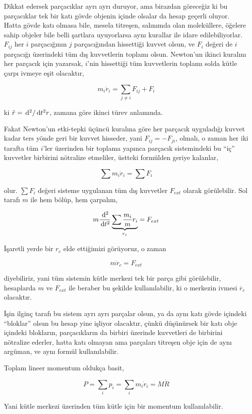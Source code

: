 \documentclass[12pt,fleqn]{article}\usepackage{../../common}
\begin{document}
Dikkat edersek parçacıklar ayrı ayrı duruyor, ama birazdan göreceğiz ki bu
parçacıklar tek bir katı gövde objenin içinde olsalar da hesap geçerli
oluyor. Hatta gövde katı olmasa bile, mesela titreşen, salınımda olan
moleküllere, öğelere sahip objeler bile belli şartlara uyuyorlarsa aynı kurallar
ile idare edilebiliyorlar. $F_{ij}$ her $i$ parçacığının $j$ parçacığından
hissettiği kuvvet olsun, ve $F_i$ değeri de $i$ parçacığı üzerindeki tüm dış
kuvvetlerin toplamı olsun. Newton'un ikinci kuralını her parçacık için yazarsak,
$i$'nin hissettiği tüm kuvvetlerin toplamı solda kütle çarpı ivmeye eşit
olacaktır,

$$
m_i \ddot{r}_i = \sum _{j \ne i} F_{ij} + F_i
$$

ki $\ddot{r} = \,\mathrm{d}^2 / \,\mathrm{d} t^2 r$, zamana göre ikinci türev anlamında.

Fakat Newton'un etki-tepki üçüncü kuralına göre her parçacık uyguladığı kuvvet
kadar ters yönde geri bir kuvvet hisseder, yani $F_{ij} = -F_{ji}$, olmalı, o
zaman her iki tarafta tüm $i$'ler üzerinden bir toplama yapınca parçacık
sistemindeki bu ``iç'' kuvvetler birbirini nötralize etmeliler, üstteki
formülden geriye kalanlar,

$$
\sum m_i \ddot{r}_i =  \sum F_i
$$

olur. $\sum F_i$ değeri sisteme uygulanan tüm dış kuvvetler $F_{ext}$ olarak
görülebilir. Sol tarafı $m$ ile hem bölüp, hem çarpalım,

$$
m \frac{\,\mathrm{d}^2}{\,\mathrm{d} t^2} \underbrace{\sum \frac{m_i}{m} r_i}_{r_c} =
F_{ext}
$$

İşaretli yerde bir $r_c$ elde ettiğimizi görüyoruz, o zaman 

$$
m\ddot{r}_c = F_{ext}
$$

diyebiliriz, yani tüm sistemin kütle merkezi tek bir parça gibi görülebilir,
hesaplarda $m$ ve $F_{ext}$ ile beraber bu şekilde kullanılabilir, ki
o merkezin ivmesi $\ddot{r_c}$ olacaktır.

İşin ilginç tarafı bu sistem ayrı ayrı parçalar olsun, ya da aynı katı gövde
içindeki ``bloklar'' olsun bu hesap yine işliyor olacaktır, çünkü düşünürsek bir
katı obje içindeki blokların, parçacıkların da birbiri üzerinde kuvvetleri de
birbirini nötralize ederler, hatta katı olmayan ama parçaları titreşen obje için
de aynı argüman, ve aynı formül kullanılabilir.

Toplam lineer momentum oldukça basit,

$$
P = \sum_i p_i = \sum_i m_i \dot{r}_i = M \dot{R}
$$

Yani kütle merkezi üzerinden tüm kütle için bir momentum kullanılabilir.
\end{document}
